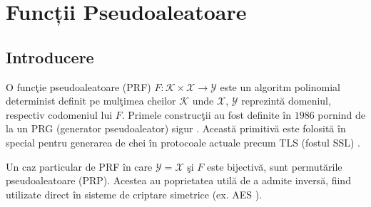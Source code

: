 \documentclass[oneside, 12pt]{book}
\begin{document}

\chapter{Funcții Pseudoaleatoare}
\label{cha:prf}

\section{Introducere}

O funcţie pseudoaleatoare (PRF) $F : \mathcal{K} \times \mathcal{X} \rightarrow \mathcal{Y}$ este un algoritm polinomial determinist definit pe mulţimea cheilor $\mathcal{K}$ unde $\mathcal{X}$, $\mathcal{Y}$ reprezintă domeniul, respectiv codomeniul lui $F$.
Primele construcţii au fost definite în $1986$ pornind de la un PRG (generator pseudoaleator) sigur \cite{goldreich1986construct}. Această primitivă este folosită în special pentru generarea de chei în protocoale actuale precum TLS (fostul SSL) \cite{dierks2008transport}.

Un caz particular de PRF în care $\mathcal{Y} = \mathcal{X}$ şi $F$ este bijectivă, sunt permutările pseudoaleatoare (PRP). Acestea au poprietatea utilă de a admite inversă, fiind utilizate direct în sisteme de criptare simetrice (ex. AES \cite{daemen:2013design}).
\end{document}
